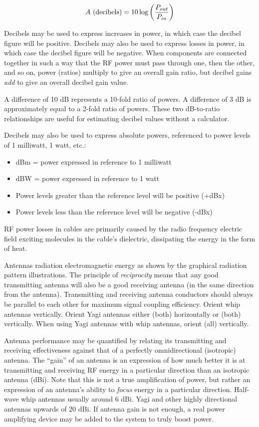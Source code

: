 $$A \hbox{ (decibels)} = 10 \log \left(P_{out} \over P_{in}\right)$$

Decibels may be used to express increases in power, in which case the decibel figure will be positive.  Decibels may also be used to express losses in power, in which case the decibel figure will be negative.  When components are connected together in such a way that the RF power must pass through one, then the other, and so on, power (ratios) multiply to give an overall gain ratio, but decibel gains {\it add} to give an overall decibel gain value.

A difference of 10 dB represents a 10-fold ratio of powers.  A difference of 3 dB is approximately equal to a 2-fold ratio of powers.  These two dB-to-ratio relationships are useful for estimating decibel values without a calculator.

\vskip 10pt

Decibels may also be used to express absolute powers, referenced to power levels of 1 milliwatt, 1 watt, etc.:

\begin{itemize}
\item{} dBm = power expressed in reference to 1 milliwatt
\item{} dBW = power expressed in reference to 1 watt
\item{} Power levels greater than the reference level will be positive (+dBx)
\item{} Power levels less than the reference level will be negative (-dBx)
\end{itemize}

RF power losses in cables are primarily caused by the radio frequency electric field exciting molecules in the cable's dielectric, dissipating the energy in the form of heat.

\vskip 10pt

Antennas radiation electromagnetic energy as shown by the graphical radiation pattern illustrations.  The principle of {\it reciprocity} means that any good transmitting antenna will also be a good receiving antenna (in the same direction from the antenna).  Transmitting and receiving antenna conductors should always be parallel to each other for maximum signal coupling efficiency.  Orient whip antennas vertically.  Orient Yagi antennas either (both) horizontally or (both) vertically.  When using Yagi antennas with whip antennas, orient (all) vertically.

\vskip 10pt

Antenna performance may be quantified by relating its transmitting and receiving effectiveness against that of a perfectly omnidirectional (isotropic) antenna.  The ``gain'' of an antenna is an expression of how much better it is at transmitting and receiving RF energy in a particular direction than an isotropic antenna (dBi).  Note that this is not a true amplification of power, but rather an expression of an antenna's ability to {\it focus} energy in a particular direction.  Half-wave whip antennas usually around 6 dBi.  Yagi and other highly directional antennas upwards of 20 dBi.  If antenna gain is not enough, a real power amplifying device may be added to the system to truly boost power.

